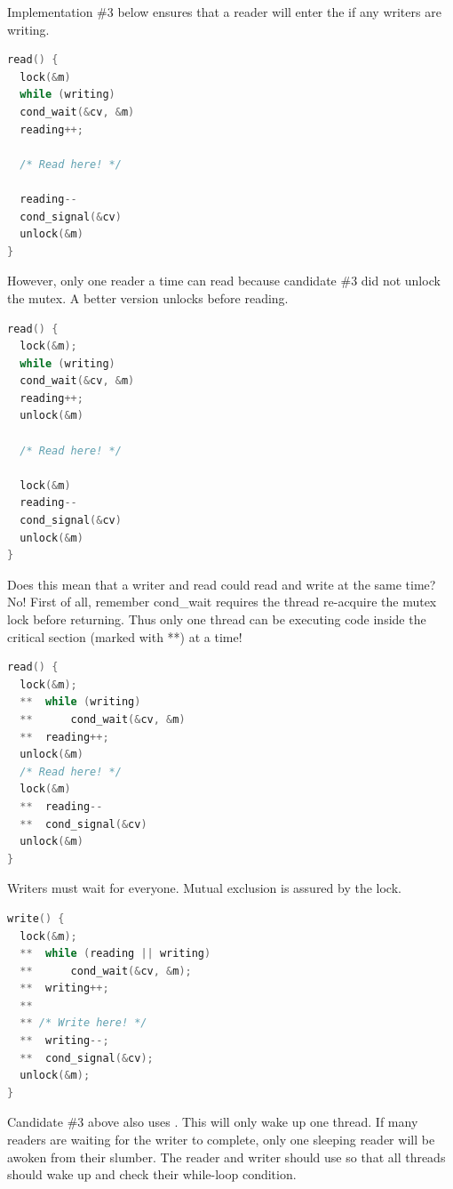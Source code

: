 Implementation \#3 below ensures that a reader will enter the  if any writers are writing.

\begin{lstlisting}[language=C]
read() {
  lock(&m)
  while (writing)
  cond_wait(&cv, &m)
  reading++;

  /* Read here! */

  reading--
  cond_signal(&cv)
  unlock(&m)
}
\end{lstlisting}

However, only one reader a time can read because candidate \#3 did not unlock the mutex.
A better version unlocks before reading.

\begin{lstlisting}[language=C]
read() {
  lock(&m);
  while (writing)
  cond_wait(&cv, &m)
  reading++;
  unlock(&m)

  /* Read here! */

  lock(&m)
  reading--
  cond_signal(&cv)
  unlock(&m)
}
\end{lstlisting}

Does this mean that a writer and read could read and write at the same time?
No! First of all, remember cond\_wait requires the thread re-acquire the mutex lock before returning.
Thus only one thread can be executing code inside the critical section (marked with **) at a time!

\begin{lstlisting}[language=C]
read() {
  lock(&m);
  **  while (writing)
  **      cond_wait(&cv, &m)
  **  reading++;
  unlock(&m)
  /* Read here! */
  lock(&m)
  **  reading--
  **  cond_signal(&cv)
  unlock(&m)
}
\end{lstlisting}

Writers must wait for everyone.
Mutual exclusion is assured by the lock.

\begin{lstlisting}[language=C]
write() {
  lock(&m);
  **  while (reading || writing)
  **      cond_wait(&cv, &m);
  **  writing++;
  **
  ** /* Write here! */
  **  writing--;
  **  cond_signal(&cv);
  unlock(&m);
}
\end{lstlisting}

Candidate \#3 above also uses .
This will only wake up one thread.
If many readers are waiting for the writer to complete, only one sleeping reader will be awoken from their slumber.
The reader and writer should use  so that all threads should wake up and check their while-loop condition.

